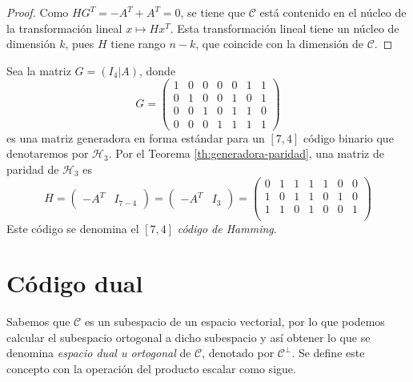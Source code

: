 \begin{proof}
    Como $HG^T = -A^T + A^T = 0$, se tiene que $\mathcal{C}$ está contenido en el núcleo de la transformación lineal $x \mapsto Hx^T$. Esta transformación lineal tiene un núcleo de dimensión $k$, pues $H$ tiene rango $n-k$, que coincide con la dimensión de $\mathcal{C}$.
\end{proof}

\begin{exampleth}
    \label{ex:generadora-paridad}
    Sea la matriz $G = \left( I_4 | A \right)$, donde 
    \[
        G = \left( 
        \begin{array}{cccc|ccc}  
            1 & 0 & 0 & 0 & 0 & 1 & 1 \\
            0 & 1 & 0 & 0 & 1 & 0 & 1 \\
            0 & 0 & 1 & 0 & 1 & 1 & 0 \\
            0 & 0 & 0 & 1 & 1 & 1 & 1
        \end{array} 
        \right)
    \]
    es una matriz generadora en forma estándar para un $[7, 4]$ código binario que denotaremos por $\mathcal{H}_3$. Por el Teorema \ref{th:generadora-paridad}, una matriz de paridad de $\mathcal{H}_3$ es
    \[ 
        H = 
        \left( 
        \begin{array}{c|c}  
            -A^T & I_{7-4}
        \end{array} 
        \right)
        = 
        \left( 
        \begin{array}{c|c}  
            -A^T & I_{3}
        \end{array} 
        \right)
        =
        \left( 
        \begin{array}{cccc|ccc}  
            0 & 1 & 1 & 1 & 1 & 0 & 0 \\
            1 & 0 & 1 & 1 & 0 & 1 & 0 \\
            1 & 1 & 0 & 1 & 0 & 0 & 1 \\
        \end{array} 
        \right)
    \]
    Este código se denomina el $[7, 4]$ \emph{código de Hamming}.
\end{exampleth}

\section{Código dual}

Sabemos que $\mathcal{C}$ es un subespacio de un espacio vectorial, por lo que podemos calcular el subespacio ortogonal a dicho subespacio y así obtener lo que se denomina \emph{espacio dual u ortogonal} de $\mathcal{C}$, denotado por $\mathcal{C} ^{\perp}$. Se define este concepto con la operación del producto escalar como sigue.

